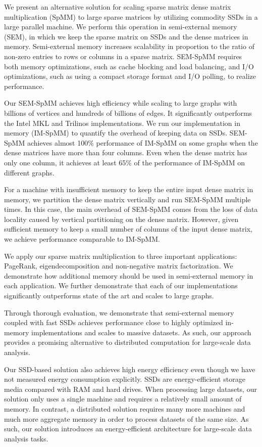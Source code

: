 We present an alternative solution for scaling sparse matrix dense matrix
multiplication (SpMM) to large sparse matrices by utilizing commodity SSDs
in a large parallel machine. We perform this operation in semi-external memory
(SEM), in which we keep the sparse matrix on SSDs and the dense matrices in
memory. Semi-external memory increases scalability in proportion to the ratio
of non-zero entries to rows or columns in a sparse matrix. SEM-SpMM requires
both memory optimizations, such as cache blocking and load balancing, and
I/O optimizations, such as using a compact storage format and I/O polling, to
realize performance.

Our SEM-SpMM achieves high efficiency while scaling to large graphs with
billions of vertices and hundreds of billions of edges. It significantly
outperforms the Intel MKL and Trilinos implementations. We run our
implementation in memory (IM-SpMM) to quantify the overhead of keeping data
on SSDs. SEM-SpMM achieves almost 100\% performance of IM-SpMM on some graphs
when the dense matrices have more than four columns. Even when the dense matrix
has only one column, it achieves at least 65\% of the performance of IM-SpMM
on different graphs.

For a machine with insufficient memory to keep the entire input dense matrix
in memory, we partition the dense matrix vertically and run SEM-SpMM multiple
times. In this case, the main overhead of SEM-SpMM comes from the loss of
data locality caused by vertical partitioning on the dense matrix. However,
given sufficient memory to keep a small number of columns of the input dense
matrix, we achieve performance comparable to IM-SpMM.

We apply our sparse matrix multiplication to three important applications:
PageRank, eigendecomposition and non-negative matrix factorization. We demonstrate
how additional memory should be used in semi-external memory in each application.
We further demonstrate that each of our implementations significantly outperforms
state of the art and scales to large graphs.

Through thorough evaluation, we demonstrate that semi-external memory
coupled with fast SSDs achieves performance close to highly optimized
in-memory implementations and scales to massive datasets.
As such, our approach provides a promising alternative to distributed
computation for large-scale data analysis.

Our SSD-based solution also achieves high energy efficiency even though
we have not measured energy consumption explicitly. SSDs are energy-efficient
storage media \cite{Tsirogiannis} compared with RAM and hard drives.
When processing large datasets, our solution only uses
a single machine and requires a relatively small amount of memory. In contrast,
a distributed solution requires many more machines and much more aggregate
memory in order to process datasets of the same size. As such, our solution
introduces an energy-efficient architecture for large-scale data analysis tasks.
